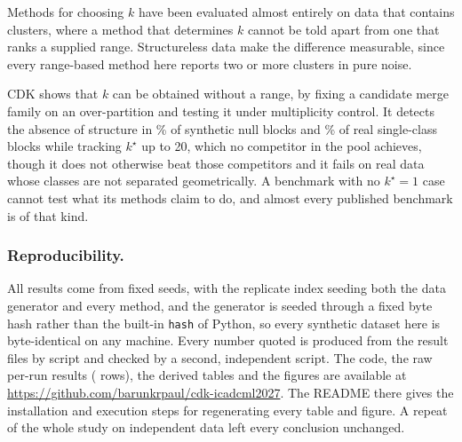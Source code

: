 \documentclass[runningheads]{llncs}
\newcommand{\repourl}{https://github.com/barunkrpaul/cdk-icadcml2027}
\begin{document}
Methods for choosing $k$ have been evaluated almost entirely on data that
contains clusters, where a method that determines $k$ cannot be told apart
from one that ranks a supplied range. Structureless data make the difference
measurable, since every range-based method here reports two or more clusters
in pure noise.

CDK shows that $k$ can be obtained without a range, by fixing a candidate
merge family on an over-partition and testing it under multiplicity control.
It detects the absence of structure in \nCDKNULL\% of synthetic null blocks
and \nCDKRNULL\% of real single-class blocks while tracking $k^\star$ up to
20, which no competitor in the pool achieves, though it does not otherwise
beat those competitors and it fails on real data whose classes are not
separated geometrically. A benchmark with no $k^\star = 1$ case cannot test what its methods claim
to do, and almost every published benchmark is of that kind.

\subsubsection{Reproducibility.}
All results come from fixed seeds, with the replicate index seeding both the
data generator and every method, and the generator is seeded through a fixed
byte hash rather than the built-in \texttt{hash} of Python, so every synthetic
dataset here is byte-identical on any machine. Every number quoted is produced from the
result files by script and checked by a second, independent script. The code, the raw per-run results
(\nNROWS{} rows), the derived tables and the figures are available at
\url{\repourl}. The README there gives the installation
and execution steps for regenerating every table and figure. A repeat of the whole study on independent data left every conclusion
unchanged.



\end{document}
